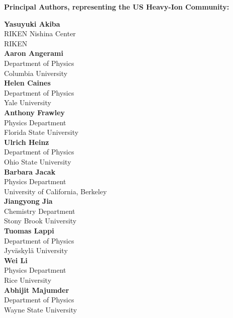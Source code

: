 
{\bf \large Principal Authors, representing the US Heavy-Ion Community:}
\vspace{5mm}

\begin{minipage}[t]{0.5\linewidth}

{\bf Yasuyuki Akiba}\\
RIKEN Nishina Center\\ 
RIKEN\\

{\bf Aaron Angerami}\\
Department of Physics\\
Columbia University\\

{\bf Helen Caines}\\
Department of Physics\\
Yale University\\

{\bf Anthony Frawley}\\
Physics Department\\
Florida State University\\

{\bf  Ulrich Heinz}\\
Department of Physics\\
Ohio State University\\

{\bf Barbara Jacak}\\
Physics Department\\
University of California, Berkeley\\

{\bf  Jiangyong Jia}\\
Chemistry Department\\
Stony Brook University\\

{\bf Tuomas Lappi}\\
Department of Physics\\
Jyv\"askyl\"a University\\

{\bf Wei Li}\\
Physics Department\\
Rice University\\

{\bf Abhijit Majumder}\\
Department of Physics\\
Wayne State University\\

\end{minipage}
